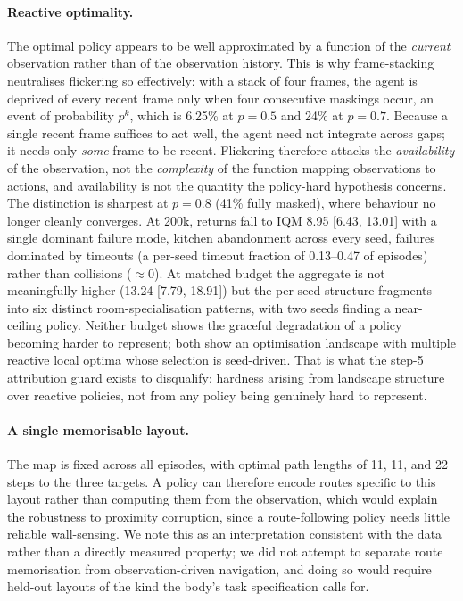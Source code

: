 \paragraph{Reactive optimality.} The optimal policy appears to be well approximated by a
function of the \emph{current} observation rather than of the observation history. This is why
frame-stacking neutralises flickering so effectively: with a stack of four frames, the agent
is deprived of every recent frame only when four consecutive maskings occur, an event of
probability $p^k$, which is 6.25\% at $p=0.5$ and 24\% at $p=0.7$. Because a single recent
frame suffices to act well, the agent need not integrate across gaps; it needs only
\emph{some} frame to be recent. Flickering therefore attacks the \emph{availability} of the
observation, not the \emph{complexity} of the function mapping observations to actions, and
availability is not the quantity the policy-hard hypothesis concerns. The distinction is
sharpest at $p=0.8$ (41\% fully masked), where behaviour no longer cleanly converges. At 200k,
returns fall to IQM 8.95 [6.43, 13.01] with a single dominant failure mode, kitchen
abandonment across every seed, failures dominated by timeouts (a per-seed timeout fraction of
0.13--0.47 of episodes) rather than collisions (${\approx}0$). At matched budget the aggregate
is not meaningfully higher (13.24 [7.79, 18.91]) but the per-seed structure fragments into six
distinct room-specialisation patterns, with two seeds finding a near-ceiling policy. Neither
budget shows the graceful degradation of a policy becoming harder to represent; both show an
optimisation landscape with multiple reactive local optima whose selection is seed-driven.
That is what the step-5 attribution guard exists to disqualify: hardness arising from
landscape structure over reactive policies, not from any policy being genuinely hard to
represent.

\paragraph{A single memorisable layout.} The map is fixed across all episodes, with optimal
path lengths of 11, 11, and 22 steps to the three targets. A policy can therefore encode
routes specific to this layout rather than computing them from the observation, which would
explain the robustness to proximity corruption, since a route-following policy needs little
reliable wall-sensing. We note this as an interpretation consistent with the data rather than
a directly measured property; we did not attempt to separate route memorisation from
observation-driven navigation, and doing so would require held-out layouts of the kind the
body's task specification calls for.

